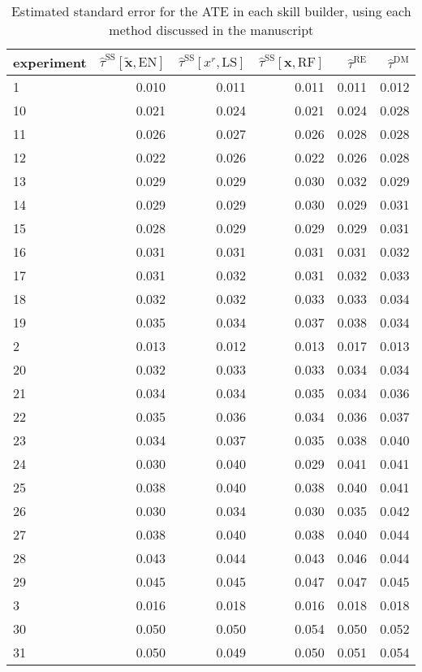\documentclass[12pt]{article}\usepackage[]{graphicx}\usepackage[]{xcolor}
\newcommand{\bx}{{\bm{x}}}
\newcommand{\xt}{{\tilde{\bm{x}}}}
\newcommand{\predr}{x^r}
\newcommand{\tsd}{\hat{\tau}^{\mathrm{DM}}}
\newcommand{\tss}{\hat{\tau}^{\mathrm{SS}}}
\newcommand{\trc}{\tss[\predr, \mathrm{LS}]}
\newcommand{\trcpen}{\tss[\xt, \mathrm{EN}]}
\newcommand{\trebar}{\hat{\tau}^{\mathrm{RE}}}
\begin{document}
\begin{table}
\caption{\label{tab:tab:SEs}Estimated standard error for the ATE
     in each skill builder, using each method 
     discussed in the manuscript}
\centering
\begin{tabular}[t]{l|r|r|r|r|r}
\hline
experiment & $\trcpen$ & $\trc$ & $\tss[\bx,\mathrm{RF}]$ & $\trebar$ & $\tsd$\\
\hline
1 & 0.010 & 0.011 & 0.011 & 0.011 & 0.012\\
\hline
10 & 0.021 & 0.024 & 0.021 & 0.024 & 0.028\\
\hline
11 & 0.026 & 0.027 & 0.026 & 0.028 & 0.028\\
\hline
12 & 0.022 & 0.026 & 0.022 & 0.026 & 0.028\\
\hline
13 & 0.029 & 0.029 & 0.030 & 0.032 & 0.029\\
\hline
14 & 0.029 & 0.029 & 0.030 & 0.029 & 0.031\\
\hline
15 & 0.028 & 0.029 & 0.029 & 0.029 & 0.031\\
\hline
16 & 0.031 & 0.031 & 0.031 & 0.031 & 0.032\\
\hline
17 & 0.031 & 0.032 & 0.031 & 0.032 & 0.033\\
\hline
18 & 0.032 & 0.032 & 0.033 & 0.033 & 0.034\\
\hline
19 & 0.035 & 0.034 & 0.037 & 0.038 & 0.034\\
\hline
2 & 0.013 & 0.012 & 0.013 & 0.017 & 0.013\\
\hline
20 & 0.032 & 0.033 & 0.033 & 0.034 & 0.034\\
\hline
21 & 0.034 & 0.034 & 0.035 & 0.034 & 0.036\\
\hline
22 & 0.035 & 0.036 & 0.034 & 0.036 & 0.037\\
\hline
23 & 0.034 & 0.037 & 0.035 & 0.038 & 0.040\\
\hline
24 & 0.030 & 0.040 & 0.029 & 0.041 & 0.041\\
\hline
25 & 0.038 & 0.040 & 0.038 & 0.040 & 0.041\\
\hline
26 & 0.030 & 0.034 & 0.030 & 0.035 & 0.042\\
\hline
27 & 0.038 & 0.040 & 0.038 & 0.040 & 0.044\\
\hline
28 & 0.043 & 0.044 & 0.043 & 0.046 & 0.044\\
\hline
29 & 0.045 & 0.045 & 0.047 & 0.047 & 0.045\\
\hline
3 & 0.016 & 0.018 & 0.016 & 0.018 & 0.018\\
\hline
30 & 0.050 & 0.050 & 0.054 & 0.050 & 0.052\\
\hline
31 & 0.050 & 0.049 & 0.050 & 0.051 & 0.054\\

\end{tabular}
\end{table}
\end{document}
